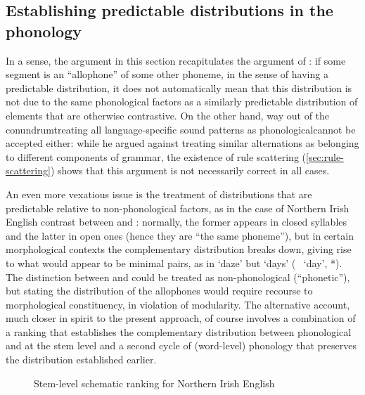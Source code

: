 \subsection{Establishing predictable distributions in the phonology}
\label{sec:establ-pred-distr}

In a sense, the argument in this section recapitulates the argument of \citet{spr}: if some segment is an \enquote{allophone} of some other phoneme, in the sense of having a predictable distribution, it does not automatically mean that this distribution is not due to the same phonological factors as a similarly predictable distribution of elements that are otherwise contrastive. On the other hand,  way out of the conundrum\dash treating all language\hyp specific sound patterns as phonological\dash cannot be accepted either: while he argued against treating similar alternations as belonging to different components of grammar, the existence of rule scattering (\cref{sec:rule-scattering}) shows that this argument is not necessarily correct in all cases.

An even more vexatious issue is the treatment of distributions that are predictable relative to non\hyp phonological factors, as in the case of Northern Irish English contrast between \ipa{[ɪə]} and \ipa{[ɛː]} \citep{harris94:_englis}: normally, the former appears in closed syllables and the latter in open ones (hence they are \enquote{the same phoneme}), but in certain morphological contexts the complementary distribution breaks down, giving rise to what would appear to be minimal pairs, as in \ipa{[ˈdɪəz]} `daze' but \ipa{[ˈdɛːz]} `days' (\cf\ \ipa{[ˈdɛː]} `day', *\ipa{[ˈdɪə]}). The distinction between \ipa{[ɪə]} and \ipa{[ɛː]} could be treated as non\hyp phonological (\ie \enquote{phonetic}), but stating the distribution of the allophones would require recourse to morphological constituency, in violation of modularity. The alternative account, much closer in spirit to the present approach, of course involves a combination of a ranking that establishes the complementary distribution between phonological \ipa{[ɪə]} and \ipa{[ɛː]} at the stem level and a second cycle of (word\hyp level) phonology that preserves the distribution established earlier.

\begin{figure}[htp]
  \centering
  \caption{Stem-level schematic ranking for Northern Irish English}
  \label{fig:days-daze-ranking}
\end{figure}

